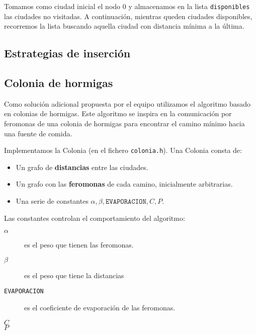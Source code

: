 

Tomamos como ciudad inicial el nodo 0 y almacenamos en la lista \texttt{disponibles}
las ciudades no visitadas. A continuación, mientras queden ciudades disponibles,
recorremos la lista buscando aquella ciudad con distancia mínima a la última.

\subsection{Estrategias de inserción}

\subsection{Colonia de hormigas}

Como solución adicional propuesta por el equipo utilizamos el algoritmo basado en
colonias de hormigas. Este algoritmo se inspira en la comunicación por feromonas
de una colonia de hormigas para encontrar el camino mínimo hacia una fuente de comida.

Implementamos la Colonia (en el fichero \texttt{colonia.h}). Una Colonia consta de:

\begin{itemize}
  \item Un grafo de \textbf{distancias} entre las ciudades.
  \item Un grafo con las \textbf{feromonas} de cada camino, inicialmente arbitrarias.
  \item Una serie de constantes $\alpha, \beta, \texttt{EVAPORACION}, C, P$.
\end{itemize}

Las constantes controlan el comportamiento del algoritmo:

\begin{description}
  \item[$\alpha$] es el peso que tienen las feromonas.
  \item[$\beta$] es el peso que tiene la distancias
  \item[\texttt{EVAPORACION}] es el coeficiente de evaporación de las feromonas.
  \item[$C$]
  \item[$P$]
\end{description}
